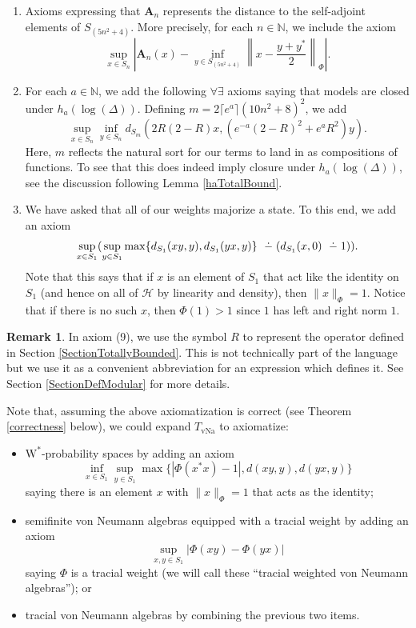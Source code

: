 \documentclass[12pt]{amsart}
\theoremstyle{definition}
\newtheorem{remark}[thm]{Remark}
\newcommand{\dminus}{ 
\buildrel\textstyle\ .\over{\hbox{ 
\vrule height3pt depth0pt width0pt}{\smash-} 
}}
\def\cal{\mathcal}
\newcommand{\wstar}{$\mathrm{W}^*$}
\DeclareMathOperator{\vNa}{vNa}
\def \vA{\mathbf{A}}
\def \bbN{\mathbb{N}}
\begin{document}
\begin{enumerate}
\begin{equation*}
\begin{split}
            &\|x - \iota_n(y)\| \dminus \bigl(\Phi((zx^*)^*(zx^*)) \dminus \,\Phi(z^*z)\bigr)\bigr\}.
        \end{split}
    \end{equation*}
    \item  Axioms expressing that $\vA_n$ represents the distance to the self-adjoint elements of $S_{(5n^2+4)}$.  More precisely, for each $n\in \bbN$, we include the axiom \[\sup_{x \in S_n} \left|\vA_n(x)-\inf_{y \in S_{(5n^2+4)}} \left\|x- \frac{y+y^*}{2}\right\|_\Phi\right|.\]
    \item For each $a \in \bbN$, we add the following $\forall\exists$ axioms saying that models are closed under $h_a(\log(\Delta))$.  Defining $m = 2\lceil e^{a} \rceil (10n^2+8)^2$, we add
    \[
        \sup_{x \in S_n}\inf_{y \in S_n} d_{S_{m}}(2R(2-R)x, (e^{-a}(2-R)^2 + e^{a}R^2)y).
    \]
    Here, $m$ reflects the natural sort for our terms to land in as compositions of functions.  To see that this does indeed imply closure under $h_a(\log(\Delta))$, see the discussion following Lemma \ref{haTotalBound}.
    \item We have asked that all of our weights majorize a state.  To this end, we add an axiom
    \[
        \sup_{x \in S_1} (\sup_{y \in S_1} \max\{d_{S_1}(xy, y), d_{S_1}(yx,y)\} \dminus (d_{S_1}(x,0) \dminus 1)).
    \]
    Note that this says that if $x$ is an element of $S_1$ that act like the identity on $S_1$ (and hence on all of $\cal H$ by linearity and density), then $\|x\|_{\Phi} = 1$.  Notice that if there is no such $x$, then $\Phi(1) > 1$ since $1$ has left and right norm $1$.
\end{enumerate}

\begin{remark}
    In axiom (9), we use the symbol $R$ to represent the operator defined in Section \ref{SectionTotallyBounded}.  This is not technically part of the language but we use it as a convenient abbreviation for an expression which defines it.  See Section \ref{SectionDefModular} for more details.
\end{remark}

Note that, assuming the above axiomatization is correct (see Theorem \ref{correctness} below), we could expand $T_{\vNa}$ to axiomatize:
\begin{itemize}
    \item \wstar-probability spaces by adding an axiom
    \[
    \inf_{x \in S_1}\sup_{y \in S_1} \max\{ |\Phi(x^*x) - 1|, d(xy, y), d(yx, y) \}
    \]
    saying there is an element $x$ with $\|x\|_{\Phi} = 1$ that acts as the identity;
    \item semifinite von Neumann algebras equipped with a tracial weight by adding an axiom
    \[
    \sup_{x,y \in S_1} |\Phi(xy) - \Phi(yx)|
    \]
    saying $\Phi$ is a tracial weight (we will call these ``tracial weighted von Neumann algebras''); or
    \item tracial von Neumann algebras by combining the previous two items.
\end{itemize}
\end{document}
